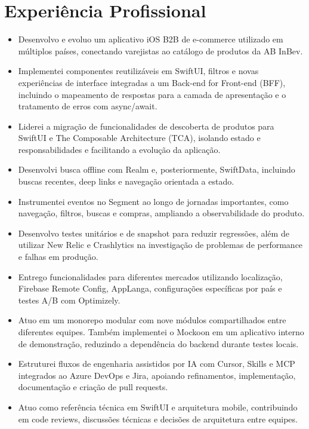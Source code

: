 \documentclass[10pt,a4paper]{article}
\begin{document}
\section{Experiência Profissional}


\begin{itemize}

\item Desenvolvo e evoluo um aplicativo iOS B2B de e-commerce utilizado em múltiplos países, conectando varejistas ao catálogo de produtos da AB InBev.

\item Implementei componentes reutilizáveis em SwiftUI, filtros e novas experiências de interface integradas a um Back-end for Front-end (BFF), incluindo o mapeamento de respostas para a camada de apresentação e o tratamento de erros com async/await.

\item Liderei a migração de funcionalidades de descoberta de produtos para SwiftUI e The Composable Architecture (TCA), isolando estado e responsabilidades e facilitando a evolução da aplicação.

\item Desenvolvi busca offline com Realm e, posteriormente, SwiftData, incluindo buscas recentes, deep links e navegação orientada a estado.

\item Instrumentei eventos no Segment ao longo de jornadas importantes, como navegação, filtros, buscas e compras, ampliando a observabilidade do produto.

\item Desenvolvo testes unitários e de snapshot para reduzir regressões, além de utilizar New Relic e Crashlytics na investigação de problemas de performance e falhas em produção.

\item Entrego funcionalidades para diferentes mercados utilizando localização, Firebase Remote Config, AppLanga, configurações específicas por país e testes A/B com Optimizely.

\item Atuo em um monorepo modular com nove módulos compartilhados entre diferentes equipes. Também implementei o Mockoon em um aplicativo interno de demonstração, reduzindo a dependência do backend durante testes locais.

\item Estruturei fluxos de engenharia assistidos por IA com Cursor, Skills e MCP integrados ao Azure DevOps e Jira, apoiando refinamentos, implementação, documentação e criação de pull requests.

\item Atuo como referência técnica em SwiftUI e arquitetura mobile, contribuindo em code reviews, discussões técnicas e decisões de arquitetura entre equipes.

\end{itemize}
\end{document}
